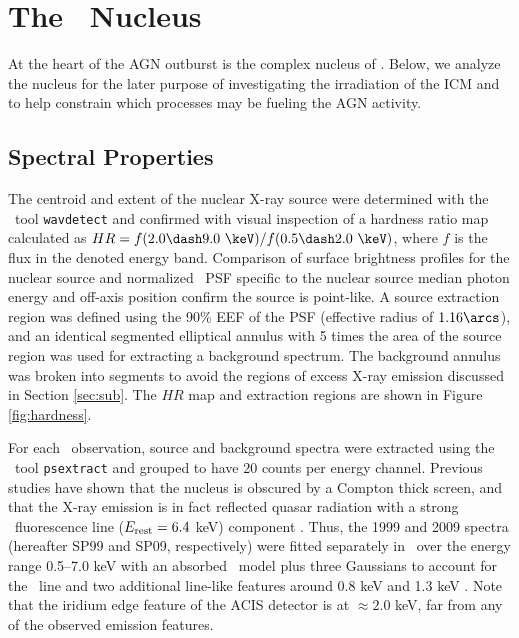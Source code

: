 \documentclass[useAMS,usenatbib]{mn2e}
\begin{document}
\section{The \irs\ Nucleus}
\label{sec:nucleus}

At the heart of the AGN outburst is the complex nucleus of
\irs. Below, we analyze the nucleus for the later purpose of
investigating the irradiation of the ICM and to help constrain which
processes may be fueling the AGN activity.

\subsection{Spectral Properties}

The centroid and extent of the nuclear X-ray source were determined
with the \ciao\ tool {\tt wavdetect} and confirmed with visual
inspection of a hardness ratio map calculated as $HR = f(2.0 \dash 9.0
~\keV) / f(0.5 \dash 2.0 ~\keV)$, where $f$ is the flux in the denoted
energy band. Comparison of surface brightness profiles for the nuclear
source and normalized \cxo\ PSF specific to the nuclear source median
photon energy and off-axis position confirm the source is
point-like. A source extraction region was defined using the 90\% EEF
of the PSF (effective radius of $1.16\arcs$), and an identical
segmented elliptical annulus with 5 times the area of the source
region was used for extracting a background spectrum. The background
annulus was broken into segments to avoid the regions of excess X-ray
emission discussed in Section \ref{sec:sub}. The $HR$ map and
extraction regions are shown in Figure \ref{fig:hardness}.

For each \cxo\ observation, source and background spectra were
extracted using the \ciao\ tool {\tt psextract} and grouped to have 20
counts per energy channel. Previous studies have shown that the
nucleus is obscured by a Compton thick screen, and that the X-ray
emission is in fact reflected quasar radiation with a strong
\feka\ fluorescence line ($E_{\rm{rest}} = 6.4$ keV) component
\citep[\eg][]{2000A&A...353..910F, 2001MNRAS.321L..15I}. Thus, the
1999 and 2009 spectra (hereafter SP99 and SP09, respectively) were
fitted separately in \xspec\ over the energy range 0.5--7.0 keV with
an absorbed \pexrav\ model \citep{pexrav} plus three Gaussians to
account for the \feka\ line and two additional line-like features
around 0.8 keV and 1.3 keV \citep[see
  also][]{2001MNRAS.321L..15I}. Note that the iridium edge feature of
the ACIS detector is at $\approx 2.0$ keV, far from any of the
observed emission features.
\end{document}
